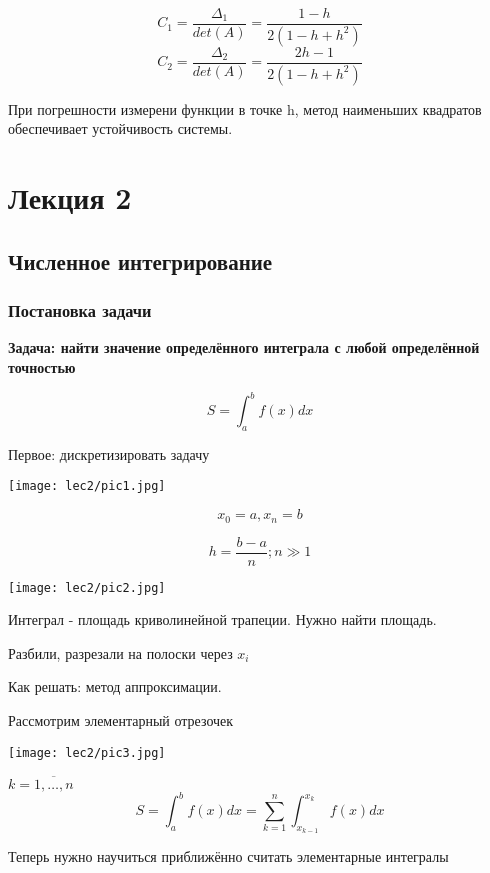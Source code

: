 \documentclass[12pt]{article}
\begin{document}
\[ C_1 = \frac{\Delta_1}{det(A)} = \frac{1 - h}{2 (1 - h + h^2)} \] 
\[ C_2 = \frac{\Delta_2}{det(A)} = \frac{2 h - 1}{2 (1 - h + h^2)} \] 

При погрешности измерени функции в точке h, метод наименьших квадратов
обеспечивает устойчивость системы.

\newpage

\section{Лекция 2}
\subsection{Численное интегрирование}
\subsubsection{Постановка задачи}
\textbf{Задача: найти значение определённого интеграла с любой определённой точностью}

\[
  S = \int_a^b f(x)dx
\] 

Первое: дискретизировать задачу

\begin{center}
	\texttt{[image: lec2/pic1.jpg]}
\end{center}

\[
  x_0 = a, x_n = b
\] 

\[
  h = \frac{b - a}{n}; n \gg 1
\]

\begin{center}
	\texttt{[image: lec2/pic2.jpg]}
\end{center}

Интеграл - площадь криволинейной трапеции. Нужно найти площадь.

Разбили, разрезали на полоски через \( x_i \)


Как решать: метод аппроксимации.

Рассмотрим элементарный отрезочек

\begin{center}
	\texttt{[image: lec2/pic3.jpg]}
\end{center}

\( k = \overline{1,\dots,n} \)
\[
  S = \int_{a}^{b} f(x)dx = \sum_{k=1}^{n} \int_{x_{k-1}}^{x_k} f(x)dx
\] 

Теперь нужно научиться приближённо считать элементарные интегралы
\end{document}
